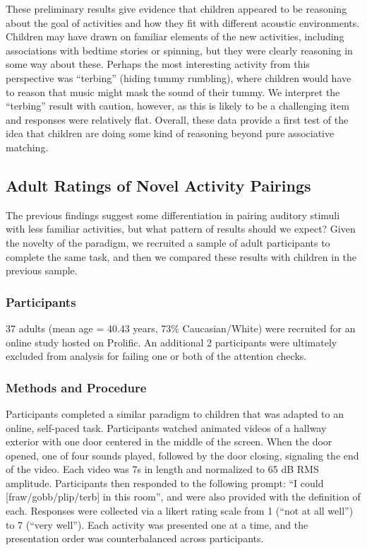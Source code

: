 \documentclass[10pt, letterpaper]{article}
\begin{document}
These preliminary results give evidence that children appeared to be
reasoning about the goal of activities and how they fit with different
acoustic environments. Children may have drawn on familiar elements of
the new activities, including associations with bedtime stories or
spinning, but they were clearly reasoning in some way about these.
Perhaps the most interesting activity from this perspective was
``terbing'' (hiding tummy rumbling), where children would have to reason
that music might mask the sound of their tummy. We interpret the
``terbing'' result with caution, however, as this is likely to be a
challenging item and responses were relatively flat. Overall, these data
provide a first test of the idea that children are doing some kind of
reasoning beyond pure associative matching.

\hypertarget{adult-ratings-of-novel-activity-pairings}{%
\subsection{Adult Ratings of Novel Activity
Pairings}\label{adult-ratings-of-novel-activity-pairings}}

The previous findings suggest some differentiation in pairing auditory
stimuli with less familiar activities, but what pattern of results
should we expect? Given the novelty of the paradigm, we recruited a
sample of adult participants to complete the same task, and then we
compared these results with children in the previous sample.

\hypertarget{participants-2}{%
\subsubsection{Participants}\label{participants-2}}

37 adults (mean age = 40.43 years, 73\% Caucasian/White) were recruited
for an online study hosted on Prolific. An additional 2 participants
were ultimately excluded from analysis for failing one or both of the
attention checks.

\hypertarget{methods-and-procedure}{%
\subsubsection{Methods and Procedure}\label{methods-and-procedure}}

Participants completed a similar paradigm to children that was adapted
to an online, self-paced task. Participants watched animated videos of a
hallway exterior with one door centered in the middle of the screen.
When the door opened, one of four sounds played, followed by the door
closing, signaling the end of the video. Each video was 7s in length and
normalized to 65 dB RMS amplitude. Participants then responded to the
following prompt: ``I could {[}fraw/gobb/plip/terb{]} in this room'',
and were also provided with the definition of each. Responses were
collected via a likert rating scale from 1 (``not at all well'') to 7
(``very well''). Each activity was presented one at a time, and the
presentation order was counterbalanced across participants.
\end{document}
